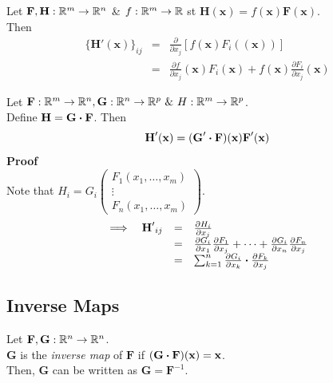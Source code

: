 \documentclass[11pt,a4paper]{article}
\begin{document}
Let $\textbf{F}, \textbf{H} : \mathbb{R}^m \to \mathbb{R}^n$ \& $f:\mathbb{R}^m \to \mathbb{R}$ st $\textbf{H}(\textbf{x})=f(\textbf{x})\textbf{F}(\textbf{x})$.\\
Then
\[\begin{array}{rcl}
\{\textbf{H}'(\textbf{x})\}_{ij} &=& \frac{\partial}{\partial x_j} \left[f(\textbf{x})F_i((\textbf{x}))\right]\\
&=& \frac{\partial f}{\partial x_j}(\textbf{x}) F_i(\textbf{x}) + f(\textbf{x}) \frac{\partial F_i}{\partial x_j}(\textbf{x})
\end{array}\]

Let $\textbf{F} : \mathbb{R}^m \to \mathbb{R}^n, \textbf{G} : \mathbb{R}^n \to \mathbb{R}^p\ \&\  {H} : \mathbb{R}^m \to \mathbb{R}^p$.\\
Define $\textbf{H}=\textbf{G} \boldsymbol{\cdot} \textbf{F}$. Then
$$\textbf{H}'(\textbf{x})=(\textbf{G}' \boldsymbol{\cdot} \textbf{F})(\textbf{x})\textbf{F}'(\textbf{x})$$
\textbf{Proof}\\
Note that $H_i = G_i\begin{pmatrix} F_1(x_1, \dots, x_m) \\ \vdots \\ F_n(x_1, \dots, x_m)\end{pmatrix}$.\\
\[\begin{array}{rrcl}
\implies& {\textbf{H}'}_{ij}&=&\frac{\partial H_i}{\partial x_j}\\
&&=&\frac{\partial G_i}{\partial x_1}\frac{\partial F_1}{\partial x_j} + \dots + \frac{\partial G_i}{\partial x_n}\frac{\partial F_n}{\partial x_j}\\
&&=&\sum_{k=1}^n\frac{\partial G_i}{\partial x_k} \boldsymbol{\cdot} \frac{\partial F_k}{\partial x_j}
\end{array}\]

\subsection{Inverse Maps}

Let $\textbf{F}, \textbf{G} : \mathbb{R}^n \to \mathbb{R}^n$.\\
$\textbf{G}$ is the \textit{inverse map} of $\textbf{F}$ if $(\textbf{G} \boldsymbol{\cdot} \textbf{F})(\textbf{x}) = \textbf{x}$.\\
Then, $\textbf{G}$ can be written as $\textbf{G} = \textbf{F}^{-1}$.\\
\end{document}
